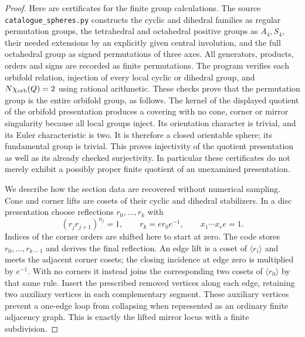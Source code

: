 \begin{proof}
Here are certificates for the finite group calculations.  The source
\texttt{catalogue\_spheres.py} constructs the cyclic and dihedral
families as regular permutation groups, the tetrahedral and octahedral
positive groups as $A_4,S_4$, their needed extensions by an explicitly
given central involution, and the full octahedral group as signed
permutations of three axes.  All generators, products, orders and signs
are recorded as finite permutations.  The program verifies each
orbifold relation, injection of every local cyclic or dihedral group,
and $N\chi_{\rm orb}(Q)=2$ using rational arithmetic.  These checks
prove that the permutation group is the entire orbifold group, as
follows.  The kernel of the displayed quotient of the orbifold
presentation produces a covering with no cone, corner or mirror
singularity because all local groups inject.  Its orientation
character is trivial, and its Euler characteristic is two.  It is
therefore a closed orientable sphere; its fundamental group is trivial.
This proves injectivity of the quotient presentation as well as its
already checked surjectivity.  In particular these certificates do
not merely exhibit a possibly proper finite quotient of an unexamined
presentation.

We describe how the section data are recovered without numerical
sampling.  Cone and corner lifts are cosets of their cyclic and
dihedral stabilizers.  In a disc presentation choose reflections
$r_0,\ldots,r_k$ with
\[
 (r_jr_{j+1})^{n_j}=1,\qquad
 r_k=e r_0e^{-1},\qquad x_1\cdots x_r e=1.            \tag{B.26.4}
\]
Indices of the corner orders are shifted here to start at zero.
The code stores $r_0,\ldots,r_{k-1}$ and derives the final reflection.
An edge lift is a coset of $\langle r_i\rangle$ and meets the adjacent
corner cosets; the closing incidence at edge zero is multiplied by
$e^{-1}$.  With no corners it instead joins the corresponding two
cosets of $\langle r_0\rangle$ by that same rule.  Insert the prescribed
removed vertices along each edge, retaining two auxiliary vertices in
each complementary segment.  These auxiliary vertices prevent a
one-edge loop from collapsing when represented as an ordinary finite
adjacency graph.  This is exactly the lifted mirror locus with a
finite subdivision.


\end{proof}
